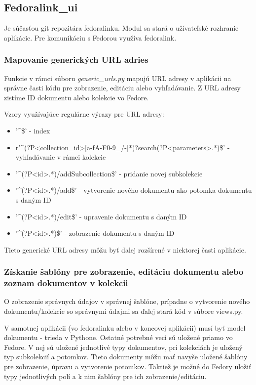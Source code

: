 \documentclass[thesis=M,slovak]{FITthesis}[2013/05/06]
\begin{document}
\subsection{Fedoralink\_ui}
Je súčasťou git repozitára fedoralinku. Modul sa stará o užívateľské rozhranie aplikácie. Pre komunikáciu s Fedorou využíva fedoralink.

\subsubsection{Mapovanie generických URL adries}
Funkcie v rámci súboru {\em generic\_urls.py} mapujú URL adresy v aplikácii na správne časti kódu pre zobrazenie, editáciu alebo vyhľadávanie. Z URL adresy zistíme ID dokumentu alebo kolekcie vo Fedore.

Vzory využívajúce regulárne výrazy pre URL adresy:
\begin{itemize}
	\item '\textasciicircum\$' - index
	\item r'\textasciicircum(?P<collection\_id>[a-fA-F0-9\_/-]*)?search(?P<parameters>.*)\$' - vyhľadávanie v rámci kolekcie
	\item '\textasciicircum(?P<id>.*)/addSubcollection\$' - pridanie novej subkolekcie
	\item '\textasciicircum(?P<id>.*)/add\$' - vytvorenie nového dokumentu ako potomka dokumentu s daným ID
	\item '\textasciicircum(?P<id>.*)/edit\$' - upravenie dokumentu s daným ID
	\item '\textasciicircum(?P<id>.*)\$' - zobrazenie dokumentu s daným ID
\end{itemize}

Tieto generické URL adresy môžu byť ďalej rozšírené v niektorej časti aplikácie.

\subsubsection{Získanie šablóny pre zobrazenie, editáciu dokumentu alebo zoznam dokumentov v kolekcii}
O zobrazenie správnych údajov v správnej šablóne, prípadne o vytvorenie nového dokumentu/kolekcie so správnymi údajmi sa ďalej stará kód v súbore views.py.

V samotnej aplikácii (vo fedoralinku alebo v koncovej aplikácii) musí byť model dokumentu - trieda v Pythone. Ostatné potrebné veci sú uložené priamo vo Fedore. V nej sú uložené jednotlivé typy dokumentov, pri kolekciách je uložený typ subkolekcií a potomkov. Tieto dokumenty môžu mať navyše uložené šablóny pre zobrazenie, úpravu a vytvorenie potomkov. Taktiež je možné do Fedory uložiť typy jednotlivých polí a k nim šablóny pre ich zobrazenie/editáciu.
\end{document}
